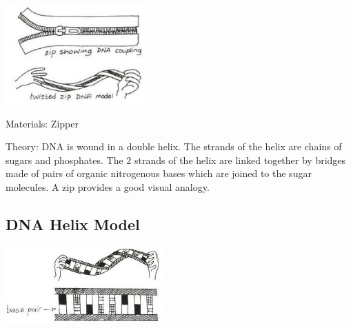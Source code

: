 \begin{multicols}{2}
\begin{center}
\includegraphics[width=0.4\textwidth]{./img/vso/dna-zipper.jpg}
\end{center}

\begin{description*}
\item[Materials:]{Zipper}
\item[Theory:]{DNA is wound in a double helix.
The strands of the helix are chains
of sugars and phosphates. The 2
strands of the helix are linked
together by bridges made of pairs
of organic nitrogenous bases
which are joined to the sugar
molecules. A zip provides a good
visual analogy.}
\end{description*}

\columnbreak

\subsection{DNA Helix Model}

\begin{center}
\includegraphics[width=0.45\textwidth]{./img/vso/dna-helix.jpg}
\end{center}


\end{multicols}
